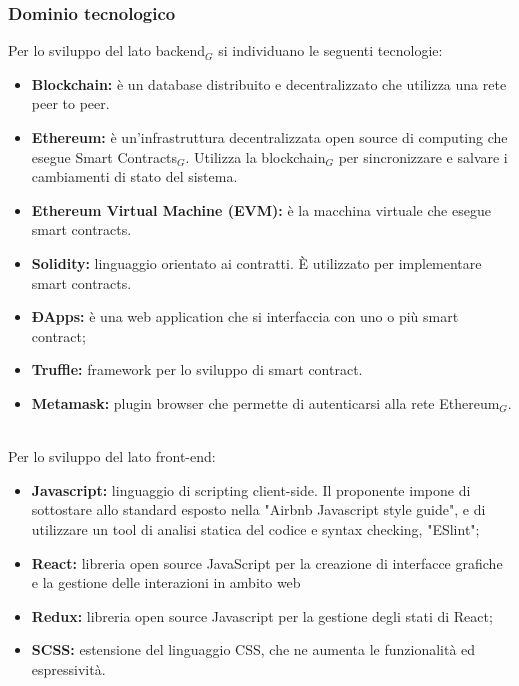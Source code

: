 \subsubsection{Dominio tecnologico}
Per lo sviluppo del lato backend$_{G}$ si individuano le seguenti tecnologie:
\begin{itemize}
    \item \textbf{Blockchain: }è un database distribuito e 
    decentralizzato che utilizza una rete peer to peer.
	\item \textbf{Ethereum: }è un'infrastruttura decentralizzata open source di computing che
	esegue Smart Contracts$_{G}$. Utilizza la blockchain$_{G}$ per sincronizzare e salvare i cambiamenti di stato
	del sistema.
	\item \textbf{Ethereum Virtual Machine (EVM): }è la macchina virtuale che esegue smart contracts.
	\item \textbf{Solidity: }linguaggio orientato ai contratti. \`E utilizzato per implementare smart contracts.
	\item \textbf{ÐApps: }è una web application che si interfaccia con uno o più smart contract;
	\item \textbf{Truffle: }framework per lo sviluppo di smart contract.
	\item \textbf{Metamask:} plugin browser che permette di autenticarsi alla rete Ethereum$_{G}$.

\end{itemize}
\mbox{}\\
Per lo sviluppo del lato front-end:
\begin{itemize}
	\item \textbf{Javascript:} linguaggio di scripting client-side. Il proponente impone di sottostare allo standard esposto nella "Airbnb Javascript style guide", e di utilizzare un tool di analisi statica del codice e syntax checking, "ESlint";
	\item \textbf{React:}  libreria open source JavaScript per la creazione di interfacce grafiche e la gestione delle interazioni in ambito web
	\item \textbf {Redux:} libreria open source Javascript per la gestione degli stati di React;
	\item \textbf{SCSS:} estensione del linguaggio CSS, che ne aumenta le funzionalità ed espressività.
\end{itemize}


